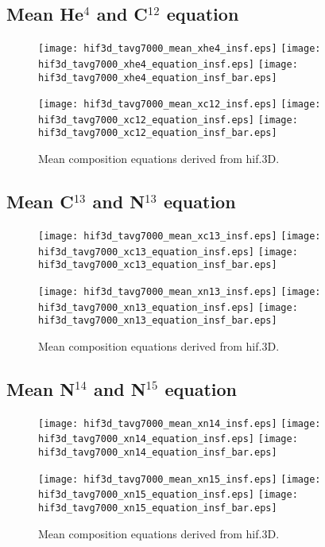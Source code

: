 \documentclass[10pt,paper=a4]{report}
\begin{document}
\newpage

\subsection{Mean He$^4$ and C$^{12}$ equation}

\begin{figure}[!h]
\centerline{
\texttt{[image: hif3d\_tavg7000\_mean\_xhe4\_insf.eps]}
\texttt{[image: hif3d\_tavg7000\_xhe4\_equation\_insf.eps]}
\texttt{[image: hif3d\_tavg7000\_xhe4\_equation\_insf\_bar.eps]}}

\centerline{
\texttt{[image: hif3d\_tavg7000\_mean\_xc12\_insf.eps]}
\texttt{[image: hif3d\_tavg7000\_xc12\_equation\_insf.eps]}
\texttt{[image: hif3d\_tavg7000\_xc12\_equation\_insf\_bar.eps]}}
\caption{Mean composition equations derived from {\sf hif.3D}. \label{fig:x-equations}}
\end{figure}

\newpage


\subsection{Mean C$^{13}$ and N$^{13}$ equation}

\begin{figure}[!h]
\centerline{
\texttt{[image: hif3d\_tavg7000\_mean\_xc13\_insf.eps]}
\texttt{[image: hif3d\_tavg7000\_xc13\_equation\_insf.eps]}
\texttt{[image: hif3d\_tavg7000\_xc13\_equation\_insf\_bar.eps]}}

\centerline{
\texttt{[image: hif3d\_tavg7000\_mean\_xn13\_insf.eps]}
\texttt{[image: hif3d\_tavg7000\_xn13\_equation\_insf.eps]}
\texttt{[image: hif3d\_tavg7000\_xn13\_equation\_insf\_bar.eps]}}
\caption{Mean composition equations derived from {\sf hif.3D}. \label{fig:x-equations}}
\end{figure}

\newpage

\subsection{Mean N$^{14}$ and N$^{15}$ equation}

\begin{figure}[!h]
\centerline{
\texttt{[image: hif3d\_tavg7000\_mean\_xn14\_insf.eps]}
\texttt{[image: hif3d\_tavg7000\_xn14\_equation\_insf.eps]}
\texttt{[image: hif3d\_tavg7000\_xn14\_equation\_insf\_bar.eps]}}

\centerline{
\texttt{[image: hif3d\_tavg7000\_mean\_xn15\_insf.eps]}
\texttt{[image: hif3d\_tavg7000\_xn15\_equation\_insf.eps]}
\texttt{[image: hif3d\_tavg7000\_xn15\_equation\_insf\_bar.eps]}}
\caption{Mean composition equations derived from {\sf hif.3D}. \label{fig:x-equations}}
\end{figure}
\end{document}
